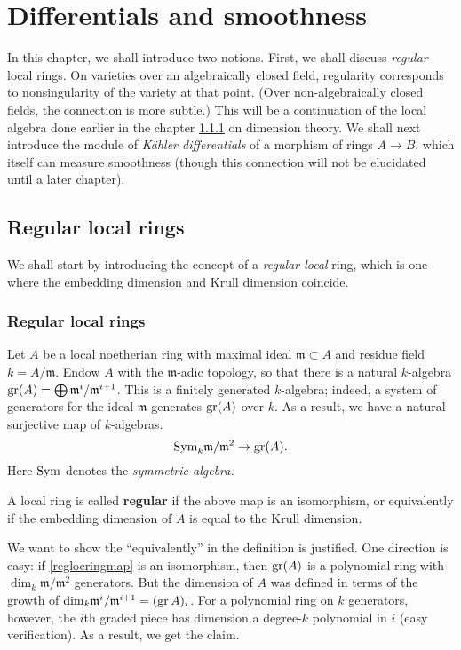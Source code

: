 \chapter{Differentials and smoothness}


In this chapter, we shall introduce two notions. First, we shall discuss
\emph{regular} local rings. On varieties over an algebraically closed field,
regularity corresponds to nonsingularity of the variety at that point.
(Over non-algebraically closed fields, the connection is more subtle.) This
will be a continuation of the local algebra done earlier in the chapter \cref{}
on dimension theory.
We shall next introduce the module of \emph{K\"ahler differentials} of a
morphism of rings $A \to B$, which itself can measure smoothness (though this
connection will not be elucidated until a later chapter).

\section{Regular local rings}
We shall start by introducing the concept of a \emph{regular local} ring, which
is one where the embedding dimension and Krull dimension coincide.
\subsection{Regular local rings}

Let $A$ be a local noetherian ring with maximal ideal $\mathfrak{m} \subset A$
and residue field $k = A/\mathfrak{m}$.
Endow $A$ with the $\mathfrak{m}$-adic topology, so that there is a natural
$k$-algebra $\operatorname{gr}(A) = \bigoplus \mathfrak{m}^i/\mathfrak{m}^{i+1}$.
This is a finitely generated $k$-algebra; indeed, a system of generators for
the ideal $\mathfrak{m}$ generates $\operatorname{gr}(A)$ over $k$.
As a result, we have a natural surjective map of $k$-algebras.
\begin{equation} \label{reglocringmap} \mathrm{Sym}_k \mathfrak{m}/\mathfrak{m}^2 \to
\operatorname{gr}(A).  \end{equation}
Here $\mathrm{Sym}$ denotes the \emph{symmetric algebra.}
\begin{definition} A local ring is called \textbf{regular} if the above map is
an isomorphism, or equivalently if the embedding dimension of $A$ is equal to
the Krull dimension.
\end{definition}

We want to show the ``equivalently'' in the definition is justified.
One direction is easy: if \eqref{reglocringmap} is an isomorphism, then
$\operatorname{gr}(A)$ is a polynomial ring with $\dim_k \mathfrak{m}/\mathfrak{m}^2$
generators. But the dimension of $A$ was defined in terms of the growth of
$\mathrm{dim}_k \mathfrak{m}^i/\mathfrak{m}^{i+1}  = (\operatorname{gr} A)_i$. 
For a polynomial ring on $k$ generators, however, the $i$th graded piece has
dimension a degree-$k$ polynomial in $i$ (easy verification). 
As a result, we get the claim.

